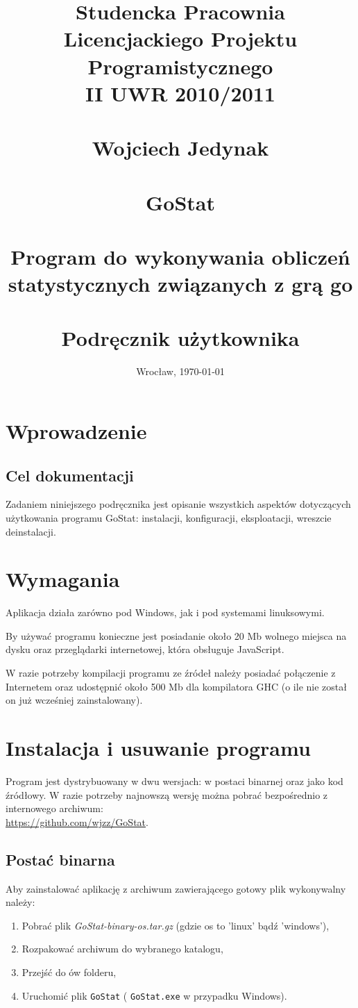 \documentclass[10pt,leqno]{article}
\title{\normalsize \textbf{Studencka Pracownia Licencjackiego Projektu Programistycznego} \\
       \textbf{II UWR 2010/2011} \\ 
       \ \\
       \vspace{15em}
       \Large Wojciech Jedynak \\
       \normalsize \ \\
       \Huge GoStat \\
       \tiny \ \\
       \LARGE \textbf{Program do wykonywania obliczeń} \\
              \textbf{statystycznych związanych z grą go} \\ 
       \ \\
       \Large Podręcznik użytkownika \\
       \vspace{15em}
       }
\date{Wrocław, \today}
\newcommand{\cmd}[1]{
  \texttt{#1}
}
\begin{document}
\maketitle 
\thispagestyle{empty}

\newpage

\tableofcontents

\newpage

\section{Wprowadzenie}

\subsection{Cel dokumentacji}
Zadaniem niniejszego podręcznika jest opisanie wszystkich aspektów dotyczących użytkowania programu GoStat: instalacji, konfiguracji,
eksploatacji, wreszcie deinstalacji.

\section{Wymagania}
Aplikacja działa zarówno pod Windows, jak i pod systemami linuksowymi.

By używać programu konieczne jest posiadanie około 20 Mb wolnego miejsca na dysku oraz przeglądarki internetowej, która obsługuje JavaScript. 

W razie potrzeby kompilacji programu ze źródeł należy posiadać połączenie z Internetem oraz udostępnić około 500 Mb dla kompilatora GHC (o ile nie 
został on już wcześniej zainstalowany).

\newpage

\section{Instalacja i usuwanie programu}
Program jest dystrybuowany w dwu wersjach: w postaci binarnej oraz jako kod źródłowy. W razie potrzeby najnowszą wersję można 
pobrać bezpośrednio z internowego archiwum: \\ 
\url{https://github.com/wjzz/GoStat}.

\subsection{Postać binarna}
Aby zainstalować aplikację z archiwum zawierającego gotowy plik wykonywalny należy: 

\begin{enumerate}
\item Pobrać plik \emph{GoStat-binary-os.tar.gz} (gdzie os to 'linux' bądź 'windows'),
\item Rozpakować archiwum do wybranego katalogu,
\item Przejść do ów folderu,
\item Uruchomić plik \cmd{GoStat} (\cmd{GoStat.exe} w przypadku Windows).
\end{enumerate}
\end{document}
